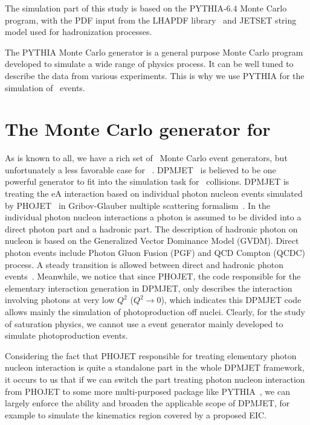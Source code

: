 The simulation part of this study is based on the PYTHIA-$6.4$ Monte Carlo program,
with the PDF input from the LHAPDF library~\cite{Whalley:2005nh} and JETSET string model used for
hadronization processes. 


The PYTHIA Monte Carlo generator is a general purpose Monte Carlo program developed to simulate a wide range of physics process. It can be well tuned to describe the data from various experiments. This is why we use PYTHIA for the simulation of \ep\ events.


\section{The Monte Carlo generator for \eA\ }

As is known to all, we have a rich set of \ep\ Monte Carlo event generators, but
unfortunately a less favorable case for \eA~\cite{Boer:2011fh}.
DPMJET~\cite{Roesler:2000he} is believed to be one powerful generator to fit
into the simulation task for \eA\ collisions. DPMJET is treating the eA
interaction based on individual photon nucleon events simulated by
PHOJET~\cite{Engel:1994vs} in Gribov-Glauber multiple scattering
formalism~\cite{Engel:1996yb}. In the individual photon nucleon interactions a
photon is assumed to be divided into a direct photon part and a hadronic part. The
description of hadronic photon on nucleon is based on the Generalized Vector
Dominance Model (GVDM). Direct photon events include Photon Gluon Fusion (PGF)
and QCD Compton (QCDC) process. A steady transition is allowed between direct
and hadronic photon events~\cite{Roesler:1998wy}. Meanwhile, we notice that
since PHOJET, the code responsible for the elementary interaction generation in
DPMJET, only describes the interaction involving photons at very low $Q^2$ ($Q^{2}\rightarrow 0$), which indicates 
this DPMJET code allows mainly the simulation of
photoproduction off nuclei. Clearly, for the study of saturation physics, we cannot use a event generator
mainly developed to simulate photoproduction events. 

Considering the fact that PHOJET responsible for treating elementary photon
nucleon interaction is quite a standalone part in the whole DPMJET framework, it
occurs to us that if we can switch the part treating photon nucleon interaction
from PHOJET to some more multi-purposed package like
PYTHIA~\cite{Sjostrand:2006za}, we can largely enforce the ability and broaden
the applicable scope of DPMJET, for example to simulate the kinematics region
covered by a proposed EIC.

